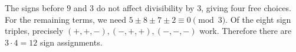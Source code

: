 The signs before $9$ and $3$ do not affect divisibility by $3$, giving four free choices. For the remaining terms, we need $5\pm8\pm7\pm2\equiv0\pmod3$. Of the eight sign triples, precisely $(+,+,-),(-,+,+),(-,-,-)$ work. Therefore there are $3\cdot4=\boxed{12}$ sign assignments.
